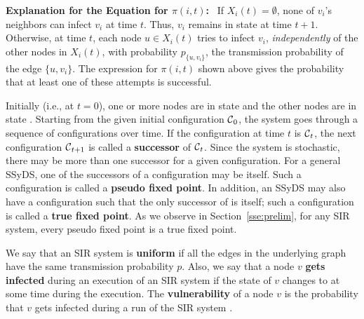 \noindent
\textbf{Explanation for the Equation for $\pi(i,t)$:}~
If $X_i(t) = \emptyset$, none of $v_i$'s neighbors 
can infect $v_i$ at time $t$. 
Thus, $v_i$ remains in state \sstate{} at time $t+1$.
Otherwise, at time $t$, each node $u \in X_i(t)$ 
tries to infect $v_i$, \emph{independently} of the other nodes in $X_i(t)$,
with probability $p_{\{u,v_i\}}$, the transmission probability of
the edge $\{u,v_i\}$.
The expression for $\pi(i,t)$ shown above
gives the probability that at least one of 
these attempts is successful.

\medskip
Initially (i.e., at $t = 0$), one or more nodes are in state \istate{}
and the other nodes are in state \sstate.
Starting from the given initial configuration $\mbox{${\cal C}$}_0$, the system
goes through a sequence of configurations over time.
If the configuration at time $t$ is $\mbox{${\cal C}$}_t$, the next configuration
$\mbox{${\cal C}$}_{t+1}$ is called a \textbf{successor} of $\mbox{${\cal C}$}_t$.
Since the system is stochastic, there may be more than one successor
for a given configuration.
For a general SSyDS, one of the successors of a configuration \calc{}
may be \calc{} itself.
Such a configuration is called a \textbf{pseudo fixed point}.
In addition, an SSyDS may also have a configuration \calc{} such that
the only successor of \calc{} is \calc{} itself; such a configuration
is called a \textbf{true fixed point}.
As we observe in Section~\ref{sse:prelim}, for any SIR system,
every pseudo fixed point is a true fixed point. 

\medskip
We say that an SIR system is \textbf{uniform} if all the edges in
the underlying graph have the same transmission probability $p$.
Also, we say that a node $v$ \textbf{gets infected} 
during an execution of an SIR system 
if the state of $v$ changes to \istate{} at
some time during the execution.
The \textbf{vulnerability} of a node $v$
is the probability that $v$ gets infected during 
a run of the SIR system \cite{EK+2005}.

